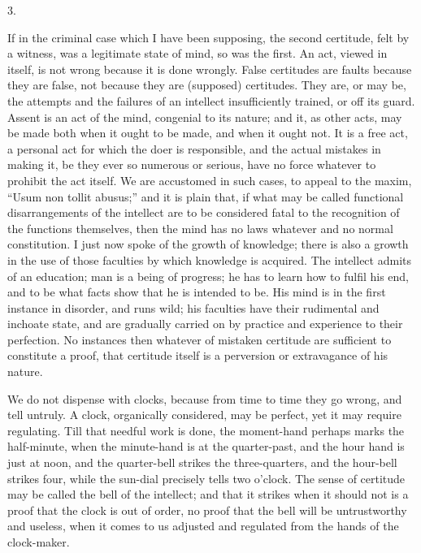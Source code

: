 3.

If in the criminal case which I have been supposing, the second
certitude, felt by a witness, was a legitimate state of mind, so was
the first. An act, viewed in itself, is not wrong because it is done
wrongly. False certitudes are faults because they are false, not
because they are (supposed) certitudes. They are, or may be, the
attempts and the failures of an intellect insufficiently trained, or
off its guard. Assent is an act of the mind, congenial to its nature;
and it, as other acts, may be made both when it ought to be made, and
when it ought not. It is a free act, a personal act for which the doer
is responsible, and the actual mistakes in making it, be they ever so
numerous or serious, have no force whatever to prohibit the act
itself. We are accustomed in such cases, to appeal to the maxim,
``Usum non tollit abusus;'' and it is plain that, if what may
be called functional disarrangements of the intellect are to be
considered fatal to the recognition of the functions themselves, then
the mind has no laws whatever and no normal constitution. I just now
spoke of the growth of knowledge; there is also a growth in the
use of those faculties by which knowledge is acquired. The intellect
admits of an education; man is a being of progress; he has to learn
how to fulfil his end, and to be what facts show that he is intended
to be. His mind is in the first instance in disorder, and runs wild;
his faculties have their rudimental and inchoate state, and are
gradually carried on by practice and experience to their perfection.
No instances then whatever of mistaken certitude are sufficient to
constitute a proof, that certitude itself is a perversion or
extravagance of his nature.

We do not dispense with clocks, because from time to time they go
wrong, and tell untruly. A clock, organically considered, may be
perfect, yet it may require regulating. Till that needful work is
done, the moment-hand perhaps marks the half-minute, when the
minute-hand is at the quarter-past, and the hour hand is just at noon,
and the quarter-bell strikes the three-quarters, and the hour-bell
strikes four, while the sun-dial precisely tells two o'clock. The
sense of certitude may be called the bell of the intellect; and that
it strikes when it should not is a proof that the clock is out of
order, no proof that the bell will be untrustworthy and useless, when
it comes to us adjusted and regulated from the hands of the
clock-maker.

